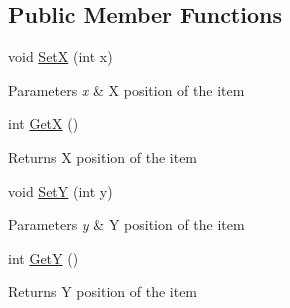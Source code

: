 \subsection*{Public Member Functions}
\begin{DoxyCompactItemize}
\item 
\mbox{\label{class_space_v_i_l_1_1_core_1_1_position_a36efdbd80c4028b3aaff4a289e6fccbf}} 
void \mbox{\hyperlink{class_space_v_i_l_1_1_core_1_1_position_a36efdbd80c4028b3aaff4a289e6fccbf}{SetX}} (int x)
\begin{DoxyCompactList}\small\item\em 
\begin{DoxyParams}{Parameters}
{\em x} & X position of the item \\
\hline
\end{DoxyParams}
\end{DoxyCompactList}\item 
\mbox{\label{class_space_v_i_l_1_1_core_1_1_position_a3233aa0f692ff65e3d930e2e25fc1832}} 
int \mbox{\hyperlink{class_space_v_i_l_1_1_core_1_1_position_a3233aa0f692ff65e3d930e2e25fc1832}{GetX}} ()
\begin{DoxyCompactList}\small\item\em \begin{DoxyReturn}{Returns}
X position of the item 
\end{DoxyReturn}
\end{DoxyCompactList}\item 
\mbox{\label{class_space_v_i_l_1_1_core_1_1_position_a014b1cf241575d54429f92c730d66199}} 
void \mbox{\hyperlink{class_space_v_i_l_1_1_core_1_1_position_a014b1cf241575d54429f92c730d66199}{SetY}} (int y)
\begin{DoxyCompactList}\small\item\em 
\begin{DoxyParams}{Parameters}
{\em y} & Y position of the item \\
\hline
\end{DoxyParams}
\end{DoxyCompactList}\item 
\mbox{\label{class_space_v_i_l_1_1_core_1_1_position_aa1fec9620d358e197516fc6e81938a9f}} 
int \mbox{\hyperlink{class_space_v_i_l_1_1_core_1_1_position_aa1fec9620d358e197516fc6e81938a9f}{GetY}} ()
\begin{DoxyCompactList}\small\item\em \begin{DoxyReturn}{Returns}
Y position of the item 
\end{DoxyReturn}
\end{DoxyCompactList}\end{DoxyCompactItemize}



